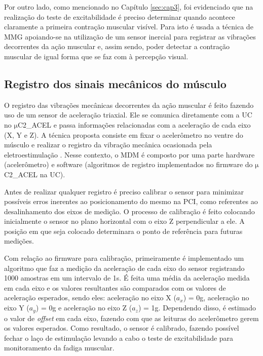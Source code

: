 Por outro lado, como mencionado no Capítulo \ref{sec:cap3}, foi evidenciado que na realização do teste de excitabilidade é preciso determinar quando acontece claramente a primeira contração muscular visível. Para isto é usada a técnica de \acrshort{MMG} apoiando-se na utilização de um sensor inercial para registrar as vibrações decorrentes da ação muscular e, assim sendo, poder detectar a contração muscular de igual forma que se faz com à percepção visual.


\subsection*{Registro dos sinais mecânicos do músculo}

O registro das vibrações mecânicas decorrentes da ação muscular é feito fazendo uso de um sensor de aceleração triaxial. Ele se comunica diretamente com a \acrshort{UC} no $\mathrm{\mu}$C2\_ACEL e passa informações relacionadas com a aceleração de cada eixo (X, Y e Z). A técnica proposta consiste em fixar o acelerômetro no ventre do músculo e realizar o registro da vibração mecânica ocasionada pela eletroestimulação \cite{Faller2009AvaliacaoEENM}. Nesse contexto, o \acrshort{MDM} é composto por uma parte hardware (acelerômetro) e software (algoritmos de registro implementados no firmware do $\mathrm{\mu}$C2\_ACEL na \acrshort{UC}). 
 
Antes de realizar qualquer registro é preciso calibrar o sensor para minimizar possíveis erros inerentes ao posicionamento do mesmo na \acrshort{PCI}, como referentes ao desalinhamento dos eixos de medição. O processo de calibração é feito colocando inicialmente o sensor no plano horizontal com o eixo Z perpendicular a ele. A posição em que seja colocado determinara o ponto de referência para futuras medições. 

Com relação ao firmware para calibração, primeiramente é implementado um algoritmo que faz a medição da aceleração de cada eixo do sensor registrando 1000 amostras em um intervalo de 1s. É feita uma média da aceleração medida em cada eixo e os valores resultantes são comparados com os valores de aceleração esperados, sendo eles: aceleração no eixo X ($a_x$) = 0g, aceleração no eixo Y ($a_y$) = 0g e aceleração no eixo Z ($a_z$) = 1g. Dependendo disso, é estimado o valor de \textit{offset} em cada eixo, fazendo com que as leituras do acelerômetro gerem os valores esperados. Como resultado, o sensor é calibrado, fazendo possível fechar o laço de estimulação levando a cabo o teste de excitabilidade para monitoramento da fadiga muscular. 

